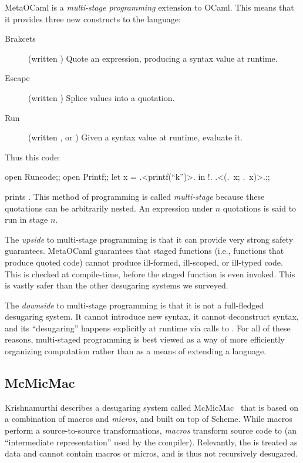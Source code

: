 MetaOCaml is a \emph{multi-stage programming} extension to OCaml. This
means that it provides three new constructs to the language:
\begin{description}
\item[Brakcets] (written ) Quote an expression,
  producing a syntax value at runtime.
\item[Escape] (written ) Splice values into a quotation.
\item[Run] (written , or ) Given a syntax value at
  runtime, evaluate it.
\end{description}
Thus this code:
\begin{Codes}
open Runcode;;
open Printf;;
let x = .<printf(``k'')>. in !. .<(.~x; .~x)>.;;
\end{Codes}
prints . This method of programming is called
\emph{multi-stage} because these quotations can be arbitrarily
nested. An expression under $n$ quotations is said to run in stage
$n$.

The \emph{upside} to multi-stage programming is that it can provide
very strong safety guarantees. MetaOCaml guarantees that staged
functions (i.e., functions that produce quoted code) cannot produce
ill-formed, ill-scoped, or ill-typed code. This is checked at
compile-time, before the staged function is even invoked. This is
vastly safer than the other desugaring systems we surveyed.

The \emph{downside} to multi-stage programming is that it is not a
full-fledged desugaring system. It cannot introduce new syntax, it
cannot deconstruct syntax, and its ``desugaring'' happens explicitly
at runtime via calls to . For all of these reasons,
multi-staged programming is best viewed as a way of more efficiently
organizing computation rather than as a means of extending a language.


\subsection{McMicMac} \label{sec:taxonomy-mcmicmac}

Krishnamurthi describes a desugaring system called
McMicMac~\cite{sk:mcmicmac} that is based on a combination of macros
and \emph{micros}, and built on top of Scheme. While macros perform a
source-to-source transformations, \emph{macros} transform source code
to  (an ``intermediate representation'' used by the compiler).
Relevantly, the  is treated as data and cannot contain macros
or micros, and is thus not recursively desugared.

